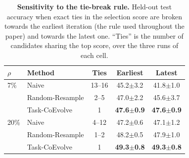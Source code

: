 \begin{table}[t]
\centering
\caption{\textbf{Sensitivity to the tie-break rule.} Held-out test accuracy when
exact ties in the selection score are broken towards the earliest iteration (the rule
used throughout the paper) and towards the latest one. ``Ties'' is the number of
candidates sharing the top score, over the three runs of each cell.}
\label{table:tiebreak}
\small
\setlength{\tabcolsep}{6pt}
\begin{tabular}{llccc}
\toprule
$\rho$ & Method & Ties & Earliest & Latest \\
\midrule
7\% & Naive & 13--16 & 45.2\scriptsize$\pm$3.2 & 41.8\scriptsize$\pm$1.0 \\
 & Random-Resample & 2--5 & 47.0\scriptsize$\pm$2.2 & 45.6\scriptsize$\pm$3.7 \\
 & Task-CoEvolve & 1 & \textbf{47.6\scriptsize$\pm$0.9} & \textbf{47.6\scriptsize$\pm$0.9} \\
\midrule
20\% & Naive & 4--12 & 47.2\scriptsize$\pm$0.6 & 47.1\scriptsize$\pm$1.2 \\
 & Random-Resample & 1--2 & 48.2\scriptsize$\pm$0.5 & 47.9\scriptsize$\pm$1.0 \\
 & Task-CoEvolve & 1 & \textbf{49.3\scriptsize$\pm$0.8} & \textbf{49.3\scriptsize$\pm$0.8} \\
\bottomrule
\end{tabular}
\end{table}
